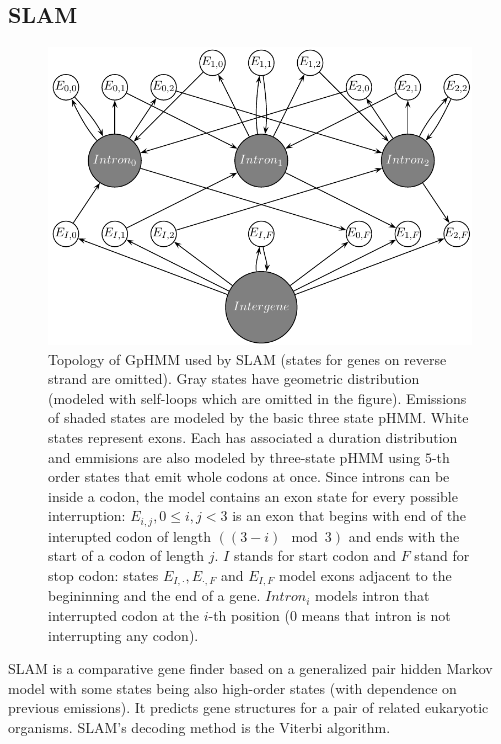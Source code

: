 \subsection{SLAM} 

\begin{figure}
\begin{center}
\includegraphics{../figures/slam.pdf}
\end{center}
\caption[HMM topology of SLAM's GpHMM]{
Topology of GpHMM used by SLAM (states for genes on reverse strand are omitted).
Gray states have geometric distribution (modeled with self-loops which are
omitted in the figure). Emissions of shaded states are modeled by the basic
three state pHMM. White states represent exons. Each has associated a duration
distribution and emmisions are also modeled by three-state pHMM using $5$-th
order states that emit whole codons at once.  Since introns can be inside a
codon, the model contains an exon state for every possible interruption:
$E_{i,j},0\leq i,j<3$ is an exon that begins with end of the interupted codon of
length $((3-i)\mod 3)$ and ends with the start of a codon of length $j$. $I$
stands for start codon and $F$ stand for stop codon: states
$E_{I,\cdot},E_{\cdot,F}$ and $E_{I,F}$ model exons adjacent to the begininning
and the end of a gene.  $Intron_i$ models intron that interrupted codon at the
$i$-th position ($0$ means that intron is not interrupting any codon).
}\label{FIGURE:SLAM} \end{figure}

SLAM \cite{SLAM2003}  is a comparative gene finder based on a generalized pair
hidden Markov model \cite{Alexanderson2004} with some states being also
high-order states (with dependence on previous emissions).  It predicts gene
structures for a pair of related eukaryotic organisms. SLAM's decoding method is
the Viterbi algorithm. 

